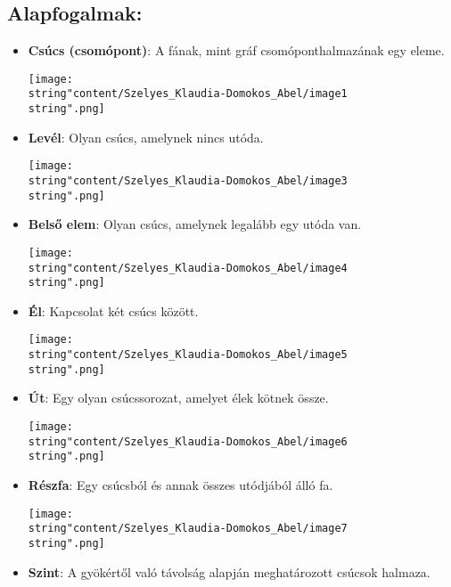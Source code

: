 \subsection*{Alapfogalmak:}
\begin{itemize}
	\item \textbf{Csúcs (csomópont)}: A fának, mint gráf csomóponthalmazának
	egy eleme.
	\begin{center}
		\texttt{[image: \\string"content/Szelyes\_Klaudia-Domokos\_Abel/image1\\string".png]}
		\par\end{center}
	\item \textbf{Levél}: Olyan csúcs, amelynek nincs utóda.
	\begin{center}
		\texttt{[image: \\string"content/Szelyes\_Klaudia-Domokos\_Abel/image3\\string".png]}
		\par\end{center}
	\item \textbf{Belső elem}: Olyan csúcs, amelynek legalább egy utóda van.
	\begin{center}
		\texttt{[image: \\string"content/Szelyes\_Klaudia-Domokos\_Abel/image4\\string".png]}
		\par\end{center}
	\item \textbf{Él}: Kapcsolat két csúcs között.
	\begin{center}
		\texttt{[image: \\string"content/Szelyes\_Klaudia-Domokos\_Abel/image5\\string".png]}
		\par\end{center}
	\item \textbf{Út}: Egy olyan csúcssorozat, amelyet élek kötnek össze.
	\begin{center}
		\texttt{[image: \\string"content/Szelyes\_Klaudia-Domokos\_Abel/image6\\string".png]}
		\par\end{center}
	\item \textbf{Részfa}: Egy csúcsból és annak összes utódjából álló fa.
	\begin{center}
		\texttt{[image: \\string"content/Szelyes\_Klaudia-Domokos\_Abel/image7\\string".png]}
		\par\end{center}
	\item \textbf{Szint}: A gyökértől való távolság alapján meghatározott csúcsok
	halmaza.
	\begin{center}

\end{center}
\end{itemize}
